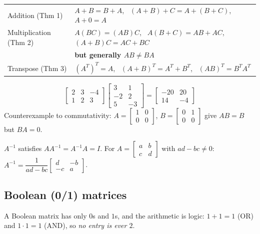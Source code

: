 \documentclass{fkt-notes}
\theoremstyle{definition}
\begin{document}
\begin{center}
  \begin{tabular}{@{}ll@{}}
    \toprule
    Addition (Thm 1)       & $A+B=B+A$, \ $(A+B)+C=A+(B+C)$, \ $A+0=A$           \\
    Multiplication (Thm 2) & $A(BC)=(AB)C$, \ $A(B+C)=AB+AC$, \ $(A+B)C=AC+BC$   \\
                           & \textbf{but generally $AB\neq BA$}                  \\
    Transpose (Thm 3)      & $(A^T)^T=A$, \ $(A+B)^T=A^T+B^T$, \ $(AB)^T=B^TA^T$ \\
    \bottomrule
  \end{tabular}
\end{center}

\begin{example}
  \[
    \begin{bmatrix}2&3&-4\\1&2&3\end{bmatrix}
    \begin{bmatrix}3&1\\-2&2\\5&-3\end{bmatrix}
    =\begin{bmatrix}-20&20\\14&-4\end{bmatrix}
  \]
  Counterexample to commutativity: $A=\begin{bmatrix}1&0\\0&0\end{bmatrix}$,
  $B=\begin{bmatrix}0&1\\0&0\end{bmatrix}$ give $AB=B$ but $BA=0$.
\end{example}

\begin{rulebox}[title=Inverse (Theorem 1.5.4)]
  $A^{-1}$ satisfies $AA^{-1}=A^{-1}A=I$. For
  $A=\begin{bmatrix}a&b\\c&d\end{bmatrix}$ with $ad-bc\neq0$:\quad
  $A^{-1}=\dfrac{1}{ad-bc}\begin{bmatrix}d&-b\\-c&a\end{bmatrix}$.
\end{rulebox}

\subsection{Boolean (0/1) matrices}\label{qg:boolmat}
%
A Boolean matrix has only $0$s and $1$s, and the arithmetic is logic:
$1+1=1$ (OR) and $1\cdot1=1$ (AND), so \emph{no entry is ever $2$}.
\end{document}
